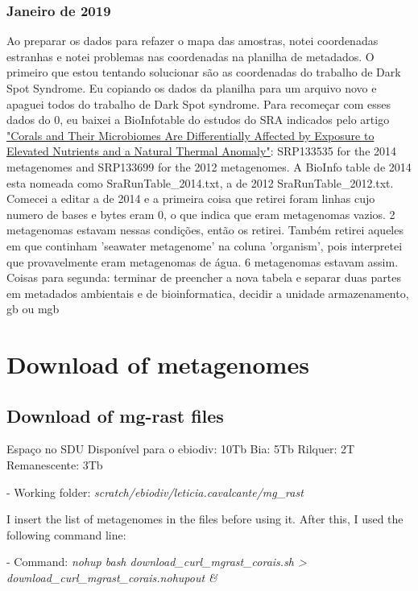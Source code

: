 \documentclass[12pt, a4paper]{report}
\begin{document}
\subsection{Janeiro de 2019}

Ao preparar os dados para refazer o mapa das amostras, notei coordenadas estranhas e notei problemas nas coordenadas na planilha de metadados. O primeiro que estou tentando solucionar são as coordenadas do trabalho de Dark Spot Syndrome. Eu copiando os dados da planilha para um arquivo novo e apaguei todos do trabalho de Dark Spot syndrome. Para recomeçar com esses dados do 0, eu baixei a BioInfotable do estudos do SRA indicados pelo artigo \href{https://www.frontiersin.org/articles/10.3389/fmars.2018.00101/full}{"Corals and Their Microbiomes Are Differentially Affected by Exposure to Elevated Nutrients and a Natural Thermal Anomaly"}: SRP133535 for the 2014 metagenomes and SRP133699 for the 2012 metagenomes. A BioInfo table de 2014 esta nomeada como SraRunTable\_2014.txt, a de 2012 SraRunTable\_2012.txt. Comecei a editar a de 2014 e a primeira coisa que retirei foram linhas cujo numero de bases e bytes eram 0, o que indica que eram metagenomas vazios. 2 metagenomas estavam nessas condições, então os retirei. Também retirei aqueles em que continham 'seawater metagenome' na coluna 'organism', pois interpretei que provavelmente eram metagenomas de água. 6 metagenomas estavam assim. 
Coisas para segunda: terminar de preencher a nova tabela e separar duas partes em metadados ambientais e de bioinformatica, decidir a unidade armazenamento, gb ou mgb

\chapter{Download of metagenomes}
\section{Download of mg-rast files} 
Espaço no SDU
Disponível para o ebiodiv: 10Tb
Bia: 5Tb
Rilquer: 2T
Remanescente: 3Tb

\begin{tcolorbox}[width=6.3in]
 \scriptsize 
 - Working folder: \textit{scratch/ebiodiv/leticia.cavalcante/mg\_rast}
 \end{tcolorbox}

I insert the list of metagenomes in the files before using it. After this, I used the following command line:

\begin{tcolorbox}[width=6.3in]
 \scriptsize 
 - Command: \textit{nohup bash download\_curl\_mgrast\_corais.sh > download\_curl\_mgrast\_corais.nohupout \&}
 \end{tcolorbox}
\end{document}
